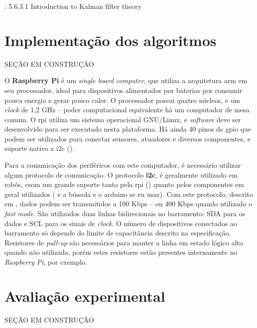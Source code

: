 \cite{siegwart2011introduction}: 5.6.3.1 Introduction to Kalman filter theory

\section{Implementação dos algoritmos}
\label{sec:software}

SEÇÃO EM CONSTRUÇÃO


O \textbf{Raspberry Pi} é um \emph{single board computer}, que utiliza a arquitetura \acrshort{arm} em seu processador, ideal para dispositivos alimentados por baterias por consumir pouca energia e gerar pouco calor. O processador possui quatro núcleos, e um \emph{clock} de 1,2 GHz -- poder computacional equivalente há um computador de mesa comum. O \acrshort{rpi} utiliza um sistema operacional GNU/Linux, e \emph{software} deve ser desenvolvido para ser executado nesta plataforma. Há ainda 40 pinos de \acrshort{gpio} que podem ser utilizados para conectar sensores, atuadores e diversos componentes, e suporte nativo a \acrshort{i2c} (\cite{upton2014raspberry}).


Para a comunicação dos periféricos com este computador, é necessário utilizar algum protocolo de comunicação. O protocolo \textbf{\acrlong{i2c}}, é geralmente utilizado em robôs, csom um grande suporte tanto pela \acrshort{rpi} (\cite{upton2014raspberry}) quanto pelos componentes em geral utilizados (\cite{MPU6050} e a bússola e o arduino se eu usar). Com este protocolo, descrito em \cite{semiconductors2000i2c}, dados podem ser transmitidos a 100 Kbps -- ou 400 Kbps quando utilizado o \emph{fast mode}. São utilizados duas linhas bidirecionais no barramento: SDA para os dados e SCL para os sinais de \emph{clock}. O número de dispositivos conectados ao barramento só depende do limite de capacitância descrito na especificação. Resistores de \emph{pull-up} são necessários para manter a linha em estado lógico alto quando não utilizada, porém estes resistores estão presentes internamente no \emph{Raspberry Pi}, por exemplo.


\section{Avaliação experimental}
\label{sec:experimental}

SEÇÃO EM CONSTRUÇÃO
